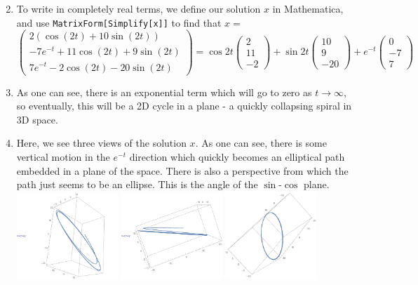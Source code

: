 \documentclass[11pt,answers]{exam}
\begin{document}
\begin{questions}
\begin{solution}
\begin{enumerate}
\[\]
\item To write in completely real terms, we define our solution $x$ in Mathematica, and use \texttt{MatrixForm[Simplify[x]]} to find that $x = $
\[
\left(\begin{array}{c} 2 (\cos (2 t)+10 \sin (2 t)) \\ -7 e^{-t}+11 \cos (2 t)+9 \sin (2 t) \\ 7 e^{-t}-2 \cos (2 t)-20 \sin (2 t) \end{array}\right) = \cos{2t}\left(\begin{array}{c}2 \\ 11 \\ -2\end{array}\right) + \sin{2t}\left(\begin{array}{c}10 \\ 9 \\ -20 \end{array}\right) + e^{-t}\left(\begin{array}{c}0 \\ -7 \\ 7\end{array}\right)
\]
\item  As one can see, there is an exponential term which will go to zero as $t \to \infty$, so eventually, this will be a 2D cycle in a plane - a quickly collapsing spiral in 3D space.
\item Here, we see three views of the solution $x$.  As one can see, there is some vertical motion in the $e^{-t}$ direction which quickly becomes an elliptical path embedded in a plane of the space.  There is also a perspective from which the path just seems to be an ellipse.  This is the angle of the $\sin$-$\cos$ plane.
\newline
\includegraphics[width=0.3\textwidth]{p42plot.pdf}
\includegraphics[width=0.3\textwidth]{p42plot2}
\includegraphics[width=0.27\textwidth]{p42plot3}
\end{enumerate}
\end{solution}



\end{questions}
\end{document}
